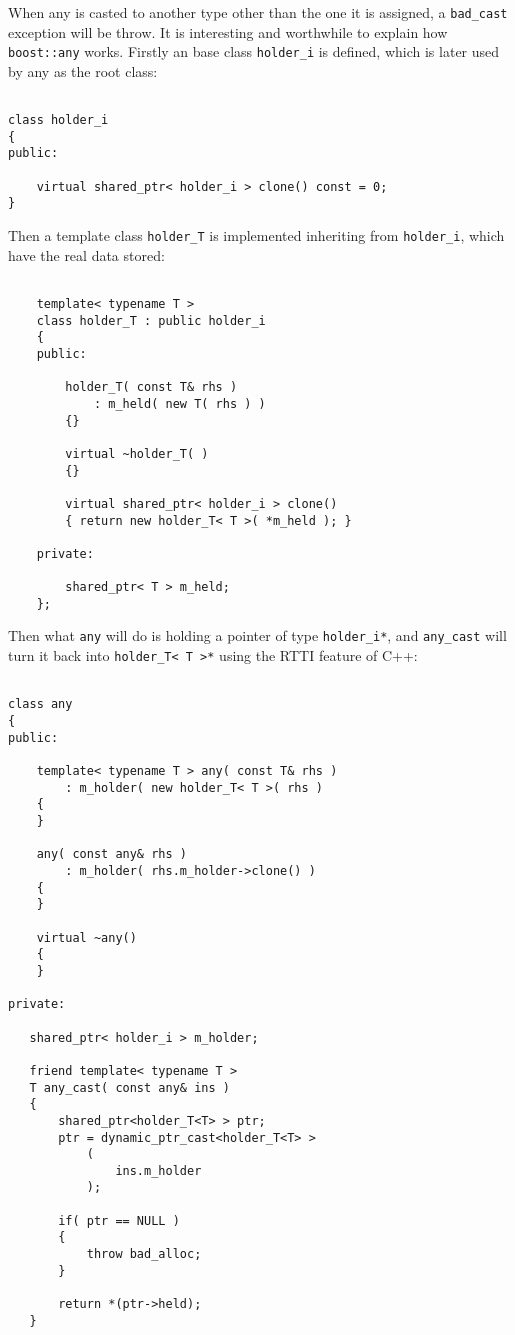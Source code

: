 \documentclass[letterpaper]{book}
\begin{document}
When any is casted to another type other than the one it is assigned, 
a \lstinline$bad_cast$ exception will be throw. It is interesting and worthwhile 
to explain how \lstinline$boost::any$ works. Firstly an base class \lstinline$holder_i$
is defined, which is later used by any as  the root class:

\begin{lstlisting}

class holder_i
{
public:

    virtual shared_ptr< holder_i > clone() const = 0;
}

\end{lstlisting}

Then a template class \lstinline$holder_T$ is implemented inheriting from \lstinline$holder_i$, 
which have the real data stored:
\begin{lstlisting}

    template< typename T > 
    class holder_T : public holder_i
    {
    public:

        holder_T( const T& rhs ) 
            : m_held( new T( rhs ) ) 
        {}

        virtual ~holder_T( ) 
        {}

        virtual shared_ptr< holder_i > clone() 
        { return new holder_T< T >( *m_held ); }

    private:

        shared_ptr< T > m_held;
    };

\end{lstlisting}

Then what \lstinline$any$ will do is holding a pointer of type \lstinline$holder_i*$, 
and \lstinline$any_cast$ will turn
it back into \lstinline$holder_T< T >*$ using the RTTI feature of C++:

\begin{lstlisting}

class any
{
public:

    template< typename T > any( const T& rhs )
        : m_holder( new holder_T< T >( rhs )
    {
    }

    any( const any& rhs )
        : m_holder( rhs.m_holder->clone() )
    {
    }

    virtual ~any()
    {
    }

private:

   shared_ptr< holder_i > m_holder;

   friend template< typename T > 
   T any_cast( const any& ins ) 
   {
       shared_ptr<holder_T<T> > ptr; 
       ptr = dynamic_ptr_cast<holder_T<T> >
           ( 
               ins.m_holder 
           );

       if( ptr == NULL )
       {
           throw bad_alloc;
       }

       return *(ptr->held); 
   }

\end{lstlisting}
\end{document}

